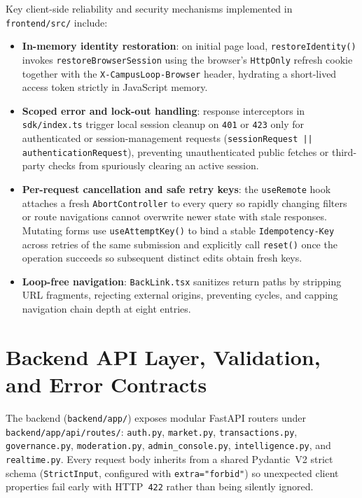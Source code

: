 Key client-side reliability and security mechanisms implemented in \texttt{frontend/src/} include:
\begin{itemize}
  \item \textbf{In-memory identity restoration}: on initial page load, \texttt{restoreIdentity()} invokes \texttt{restoreBrowserSession} using the browser's \texttt{HttpOnly} refresh cookie together with the \texttt{X-CampusLoop-Browser} header, hydrating a short-lived access token strictly in JavaScript memory.
  \item \textbf{Scoped error and lock-out handling}: response interceptors in \texttt{sdk/index.ts} trigger local session cleanup on \texttt{401} or \texttt{423} only for authenticated or session-management requests (\texttt{sessionRequest || authenticationRequest}), preventing unauthenticated public fetches or third-party checks from spuriously clearing an active session.
  \item \textbf{Per-request cancellation and safe retry keys}: the \texttt{useRemote} hook attaches a fresh \texttt{AbortController} to every query so rapidly changing filters or route navigations cannot overwrite newer state with stale responses. Mutating forms use \texttt{useAttemptKey()} to bind a stable \texttt{Idempotency-Key} across retries of the same submission and explicitly call \texttt{reset()} once the operation succeeds so subsequent distinct edits obtain fresh keys.
  \item \textbf{Loop-free navigation}: \texttt{BackLink.tsx} sanitizes return paths by stripping URL fragments, rejecting external origins, preventing cycles, and capping navigation chain depth at eight entries.
\end{itemize}

\section{Backend API Layer, Validation, and Error Contracts}
\label{sec:impl-backend}

The backend (\texttt{backend/app/}) exposes modular FastAPI routers under \texttt{backend/app/\allowbreak api/\allowbreak routes/}: \texttt{auth.py}, \texttt{market.py}, \texttt{transactions.py}, \texttt{governance.py}, \texttt{moderation.py}, \texttt{admin\_\allowbreak console.py}, \texttt{intelligence.py}, and \texttt{realtime.py}. Every request body inherits from a shared Pydantic~V2 strict schema (\texttt{StrictInput}, configured with \texttt{extra="forbid"}) \cite{pydanticDocs} so unexpected client properties fail early with HTTP~\texttt{422} rather than being silently ignored.

